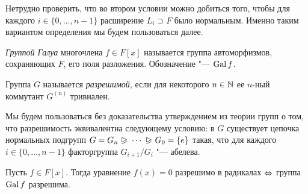 \begin{note}
	Нетрудно проверить, что во втором условии можно добиться того, чтобы для каждого $i \in \{0, \dotsc, n - 1\}$ расширение $L_i \supset F$ было нормальным. Именно таким вариантом определения мы будем пользоваться далее.
\end{note}

\begin{definition}
	\textit{Группой Галуа} многочлена $f \in F[x]$ называется группа автоморфизмов, сохраняющих $F$, его поля разложения. Обозначение "--- $\operatorname{Gal}{f}$.
\end{definition}

\begin{definition}
	Группа $G$ называется \textit{разрешимой}, если для некоторого $n \in \mathbb{N}$ ее $n$-ный коммутант $G^{(n)}$ тривиален.
\end{definition}

\begin{note}
	Мы будем пользоваться без доказательства утверждением из теории групп о том, что разрешимость эквивалентна следующему условию: в $G$ существует цепочка нормальных подгрупп $G = G_n\varnormal\dotsb\varnormal G_0 = \{e\}$ такая, что для каждого $i \in \{0, \dotsc, n - 1\}$ факторгруппа $G_{i+1}/G_i$ "--- абелева.
\end{note}

\begin{theorem}
	Пусть $f \in F[x]$. Тогда уравнение $f(x) = 0$ разрешимо в радикалах $\Leftrightarrow$ группа $\operatorname{Gal}{f}$ разрешима.
\end{theorem}

